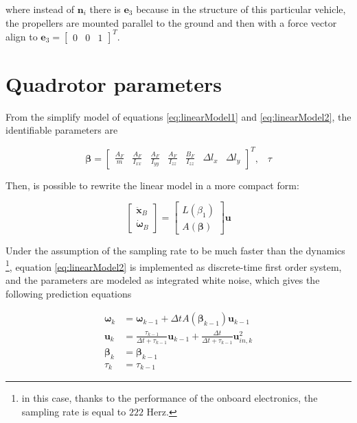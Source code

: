 \noindent where instead of $\mathbf{n}_i$ there is $\mathbf{e}_3$ because in the structure of this particular vehicle, the propellers are mounted parallel to the ground and then with a force vector align to $\mathbf{e}_3=\begin{bmatrix}0 & 0 & 1\end{bmatrix}^T$.


\section{Quadrotor parameters}
\label{quadParameters}

From the simplify model of equations \eqref{eq:linearModel1} and \eqref{eq:linearModel2}, the identifiable parameters are 

\begin{equation}
	\boldsymbol{\beta} =
	\begin{bmatrix}
		\frac{A_F}{m} & \frac{A_F}{I_{xx}} & \frac{A_F}{I_{yy}} & \frac{A_F}{I_{zz}} & \frac{B_F}{I_{zz}} & \Delta l_x & \Delta l_y 
	\end{bmatrix}^T, \hspace{10pt} \tau
	\label{eq:parameters}
\end{equation}

\noindent Then, is possible to rewrite the linear model in a more compact form:

\begin{equation}
	\begin{bmatrix}
		\ddot{\mathbf{x}}_B \\
		\dot{\boldsymbol{\omega}}_B
	\end{bmatrix}
	=
	\begin{bmatrix}
		L(\beta_1) \\
		A(\boldsymbol{\beta})
	\end{bmatrix}
	\mathbf{u}
	\label{eq:linearCompact}
\end{equation}

\noindent Under the assumption of the sampling rate to be much faster than the dynamics \footnote{in this case, thanks to the performance of the onboard electronics, the sampling rate is equal to $222$ Herz.}, equation \eqref{eq:linearModel2} is implemented as discrete-time first order system, and the parameters are modeled as integrated white noise, which gives the following prediction equations

\begin{align}
	\boldsymbol{\omega}_{k} &= \boldsymbol{\omega}_{k-1}+\Delta t A(\boldsymbol{\beta}_{k-1})\mathbf{u}_{k-1} \\
    \mathbf{u}_k &= \frac{\tau_{k-1}}{\Delta t+\tau_{k-1}}\mathbf{u}_{k-1}+\frac{\Delta t}{\Delta t+\tau_{k-1}}\mathbf{u}_{in,k}^2 \\
    \boldsymbol{\beta}_k &= \boldsymbol{\beta}_{k-1} \\
    \tau_k &= \tau_{k-1}
\end{align}

